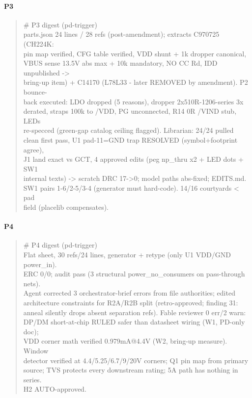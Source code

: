 \documentclass[11pt,a4paper]{article}
\begin{document}
\paragraph*{P3}
\begin{quote}\small\ttfamily\raggedright
\# P3 digest (pd-trigger)\\
parts.json 24 lines / 28 refs (post-amendment); extracts C970725 (CH224K:\\
pin map verified, CFG table verified, VDD shunt + 1k dropper canonical,\\
VBUS sense 13.5V abs max + 10k mandatory, NO CC Rd, IDD unpublished -\textgreater{}\\
bring-up item) + C14170 (L78L33 - later REMOVED by amendment). P2 bounce-\\
back executed: LDO dropped (5 reasons), dropper 2x510R-1206-series 3x\\
derated, straps 100k to /VDD, PG unconnected, R14 0R /VIND stub, LEDs\\
re-specced (green-gap catalog ceiling flagged). Librarian: 24/24 pulled\\
clean first pass, U1 pad-11=GND trap RESOLVED (symbol+footprint agree),\\
J1 land exact vs GCT, 4 approved edits (peg np\_thru x2 + LED dots + SW1\\
internal texts) -\textgreater{} scratch DRC 17-\textgreater{}0; model paths abs-fixed; EDITS.md.\\
SW1 pairs 1-6/2-5/3-4 (generator must hard-code). 14/16 courtyards \textless{} pad\\
field (placelib compensates).
\end{quote}
\paragraph*{P4}
\begin{quote}\small\ttfamily\raggedright
\# P4 digest (pd-trigger)\\
Flat sheet, 30 refs/24 lines, generator + retype (only U1 VDD/GND power\_in).\\
ERC 0/0; audit pass (3 structural power\_no\_consumers on pass-through nets).\\
Agent corrected 3 orchestrator-brief errors from file authorities; edited\\
architecture constraints for R2A/R2B split (retro-approved; finding 31:\\
anneal silently drops absent separation refs). Fable reviewer 0 err/2 warn:\\
DP/DM short-at-chip RULED safer than datasheet wiring (W1, PD-only doc);\\
VDD corner math verified 0.979mA@4.4V (W2, bring-up measure). Window\\
detector verified at 4.4/5.25/6.7/9/20V corners; Q1 pin map from primary\\
source; TVS protects every downstream rating; 5A path has nothing in series.\\
H2 AUTO-approved.
\end{quote}
\end{document}
